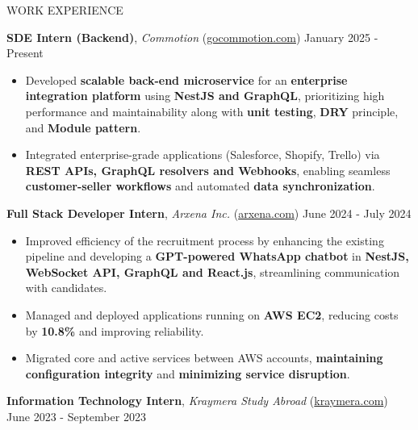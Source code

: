 \documentclass{resume} %
\begin{document}
\begin{rSection}{WORK EXPERIENCE}

    \textbf{SDE Intern (Backend)}, \textit{Commotion} (\href{https://gocommotion.com}{gocommotion.com})  \hfill January 2025 - Present

    \begin{itemize}
        \itemsep -6pt {}
            \item Developed \textbf{scalable back-end microservice} for an \textbf{enterprise integration platform} using \textbf{NestJS and GraphQL}, prioritizing high performance and maintainability along with \textbf{unit testing}, \textbf{DRY} principle, and \textbf{Module pattern}.
            \item Integrated enterprise-grade applications (Salesforce, Shopify, Trello) via \textbf{REST APIs, GraphQL resolvers and Webhooks}, enabling seamless \textbf{customer-seller workflows} and automated \textbf{data synchronization}.
    \end{itemize}

    \textbf{Full Stack Developer Intern}, \textit{Arxena Inc.} (\href{https://arxena.com}{arxena.com})  \hfill June 2024 - July 2024

    \begin{itemize}
        \itemsep -6pt {}
        \item Improved efficiency of the recruitment process by enhancing the existing
              pipeline and developing a \textbf{GPT-powered WhatsApp chatbot} in
              \textbf{NestJS, WebSocket API, GraphQL and React.js}, streamlining
              communication with candidates.
        \item  Managed and deployed applications running on \textbf{AWS EC2},
              reducing costs by \textbf{10.8\%} and improving reliability.
              \item Migrated core and active services between AWS accounts, \textbf{maintaining configuration integrity} and \textbf{minimizing service disruption}.
    \end{itemize}

    \textbf{Information Technology Intern}, \textit{Kraymera Study Abroad} (\href{https://kraymera.com}{kraymera.com})  \hfill June 2023 - September 2023

    \begin{itemize}
        \itemsep -6pt {}
        

\end{itemize}
\end{rSection}
\end{document}
